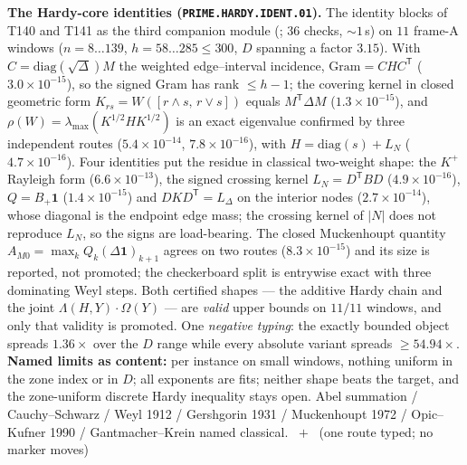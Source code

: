 \par\smallskip\noindent\textbf{The Hardy-core identities
(\texttt{PRIME.HARDY.IDENT.01}).}
The identity blocks of T140 and T141 as the third companion module
(; $36$ checks, ${\sim}1$\,s) on $11$ frame-A
windows ($n=8\ldots139$, $h=58\ldots285\le300$, $D$ spanning a factor $3.15$).
With $C=\mathrm{diag}(\sqrt\Delta)M$ the weighted edge--interval incidence,
$\mathrm{Gram}=CHC^{\mathsf T}$ ($3.0\times10^{-15}$), so the signed Gram has rank
$\le h-1$; the covering kernel in closed geometric form
$K_{rs}=W([r\wedge s,\,r\vee s])$ equals $M^{\mathsf T}\Delta M$
($1.3\times10^{-15}$), and $\rho(W)=\lambda_{\max}(K^{1/2}HK^{1/2})$ is an exact
eigenvalue confirmed by three independent routes ($5.4\times10^{-14}$,
$7.8\times10^{-16}$), with $H=\mathrm{diag}(s)+L_N$ ($4.7\times10^{-16}$). Four
identities put the residue in classical two-weight shape: the $K^{+}$ Rayleigh
form ($6.6\times10^{-13}$), the signed crossing kernel $L_N=D^{\mathsf T}BD$
($4.9\times10^{-16}$), $Q=B_+\mathbf 1$ ($1.4\times10^{-15}$) and
$DKD^{\mathsf T}=L_\Delta$ on the interior nodes ($2.7\times10^{-14}$), whose
diagonal is the endpoint edge mass; the crossing kernel of $|N|$ does not
reproduce $L_N$, so the signs are load-bearing. The closed Muckenhoupt quantity
$A_{M0}=\max_kQ_k(\Delta\mathbf 1)_{k+1}$ agrees on two routes
($8.3\times10^{-15}$) and its size is reported, not promoted; the checkerboard
split is entrywise exact with three dominating Weyl steps. Both certified shapes
--- the additive Hardy chain and the joint $\Lambda(H,Y)\cdot\Omega(Y)$ --- are
\emph{valid} upper bounds on $11/11$ windows, and only that validity is promoted.
One \emph{negative typing}: the exactly bounded object spreads $1.36\times$ over
the $D$ range while every absolute variant spreads $\ge54.94\times$.
\textbf{Named limits as content:} per instance on small windows, nothing uniform
in the zone index or in $D$; all exponents are fits; neither shape beats the
target, and the zone-uniform discrete Hardy inequality stays open.
Abel summation / Cauchy--Schwarz / Weyl 1912 / Gershgorin 1931 / Muckenhoupt 1972
/ Opic--Kufner 1990 / Gantmacher--Krein named classical.
\mE\ $+$ \mX\ (one route typed; no marker moves)
\par\smallskip


